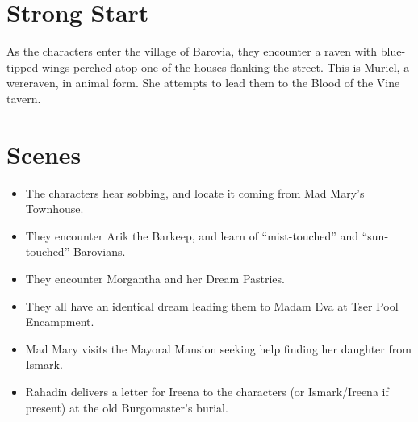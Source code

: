 \documentclass[a4paper,11pt]{article}
\begin{document}
\pagebreak
\section{Strong Start}
\label{sec:StrongStart}
As the characters enter the village of Barovia, they encounter a raven with blue-tipped wings perched atop one of
the houses flanking the street. This is Muriel, a wereraven, in animal form. She attempts to lead them to the
Blood of the Vine tavern.

\section{Scenes}
\label{sec:Scenes}
\begin{itemize}
  \item The characters hear sobbing, and locate it coming from Mad Mary's Townhouse.
  \item They encounter Arik the Barkeep, and learn of ``mist-touched'' and ``sun-touched'' Barovians.
  \item They encounter Morgantha and her Dream Pastries.
  \item They all have an identical dream leading them to Madam Eva at Tser Pool Encampment.
  \item Mad Mary visits the Mayoral Mansion seeking help finding her daughter from Ismark.
  \item Rahadin delivers a letter for Ireena to the characters (or Ismark/Ireena if present) at the old 
  Burgomaster's burial.
\end{itemize}
\end{document}
